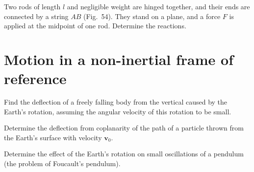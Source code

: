 \begin{problem}[title={Reactions in two hinged rods tied by a string}]
{
Two rods of length $l$ and negligible weight are hinged together, and their ends are connected by a string $AB$ (Fig.~54). They stand on a plane, and a force $F$ is applied at the midpoint of one rod. Determine the reactions.
}
{}
{}
\end{problem}

\section{Motion in a non-inertial frame of reference}


\begin{problem}[title={Falling body deflected by Earth's rotation}]
{
Find the deflection of a freely falling body from the vertical caused by the Earth's rotation, assuming the angular velocity of this rotation to be small.
}
{}
{}
\end{problem}


\begin{problem}[title={Projectile deflected by Earth's rotation}]
{
Determine the deflection from coplanarity of the path of a particle thrown from the Earth's surface with velocity $\mathbf{v}_0$.
}
{}
{}
\end{problem}


\begin{problem}[title={Foucault's pendulum}]
{
Determine the effect of the Earth's rotation on small oscillations of a pendulum (the problem of Foucault's pendulum).
}
{}
{}
\end{problem}
